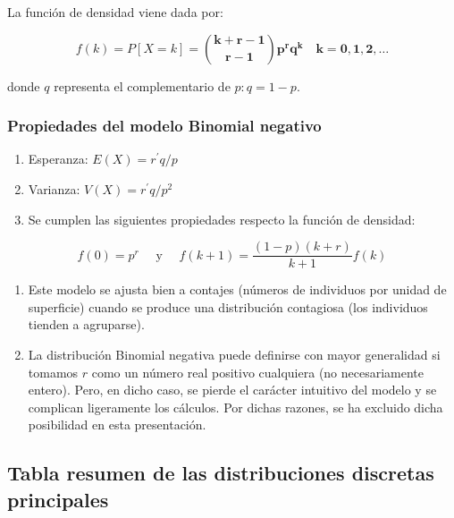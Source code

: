 \documentclass[
  a4paper,
  DIV=11,
  numbers=noendperiod]{scrreprt}
\begin{document}
La función de densidad viene dada por:

\[
f(k)=P[X=k]=\binom{\mathbf{k}+\mathbf{r}-\mathbf{1}}{\mathbf{r}-\mathbf{1}} \mathbf{p}^{\mathbf{r}} \mathbf{q}^{\mathbf{k}} \quad \mathbf{k}=\mathbf{0}, \mathbf{1}, \mathbf{2}, \ldots
\]

donde \(q\) representa el complementario de \(p: q=1-p\).

\subsubsection{Propiedades del modelo Binomial
negativo}\label{propiedades-del-modelo-binomial-negativo}

\begin{enumerate}
\def\labelenumi{\arabic{enumi}.}
\item
  Esperanza: \(E(X)=r^{\prime} q / p\)
\item
  Varianza: \(V(X)=r^{\prime} q / p^{2}\)
\item
  Se cumplen las siguientes propiedades respecto la función de densidad:
\end{enumerate}

\[
f(0)=p^{r} \quad \text { y } \quad f(k+1)=\frac{(1-p)(k+r)}{k+1} f(k)
\]

\begin{enumerate}
\def\labelenumi{\arabic{enumi}.}
\setcounter{enumi}{3}
\item
  Este modelo se ajusta bien a contajes (números de individuos por
  unidad de superficie) cuando se produce una distribución contagiosa
  (los individuos tienden a agruparse).
\item
  La distribución Binomial negativa puede definirse con mayor
  generalidad si tomamos \(r\) como un número real positivo cualquiera
  (no necesariamente entero). Pero, en dicho caso, se pierde el carácter
  intuitivo del modelo y se complican ligeramente los cálculos. Por
  dichas razones, se ha excluido dicha posibilidad en esta presentación.
\end{enumerate}

\subsection{Tabla resumen de las distribuciones discretas
principales}\label{tabla-resumen-de-las-distribuciones-discretas-principales}
\end{document}
